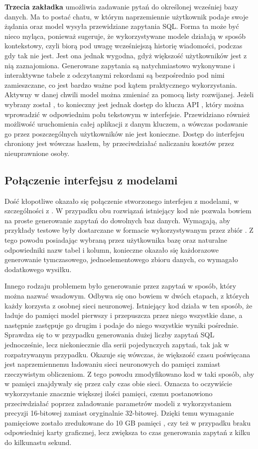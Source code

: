 \textbf{Trzecia zakładka} umożliwia zadawanie pytań do określonej wcześniej bazy danych. Ma to postać chatu, w którym naprzemiennie użytkownik podaje swoje żądania oraz model wysyła przewidziane zapytania SQL. Forma ta może być nieco myląca, ponieważ sugeruje, że wykorzystywane modele działają w sposób kontekstowy, czyli biorą pod uwagę wcześniejszą historię wiadomości, podczas gdy tak nie jest. Jest ona jednak wygodna, gdyż większość użytkowników jest z nią zaznajomiona. Generowane zapytania są natychmiastowo wykonywane i interaktywne tabele z odczytanymi rekordami są bezpośrednio pod nimi zamieszczane, co jest bardzo ważne pod kątem praktycznego wykorzystania. Aktywny w danej chwili model można zmieniać za pomocą listy rozwijanej. Jeżeli wybrany został , to konieczny jest jednak dostęp do klucza API , który można wprowadzić w odpowiednim polu tekstowym w interfejsie. Przewidziano również możliwość uruchomienia całej aplikacji z danym kluczem, a wówczas podawanie go przez poszczególnych użytkowników nie jest konieczne. Dostęp do interfejsu chroniony jest wówczas hasłem, by przeciwdziałać naliczaniu kosztów przez nieuprawnione osoby.

\subsection{Połączenie interfejsu z modelami}
Dość kłopotliwe okazało się połączenie stworzonego interfejsu z modelami, w szczególności z . W przypadku obu rozwiązań istniejący kod nie pozwala bowiem na proste generowanie zapytań do dowolnych baz danych. Wymagają, aby przykłady testowe były dostarczane w formacie wykorzystywanym przez zbiór . Z tego powodu posiadając wybraną przez użytkownika bazę oraz naturalne odpowiedniki nazw tabel i kolumn, konieczne okazało się każdorazowe generowanie tymczasowego, jednoelementowego zbioru danych, co wymagało dodatkowego wysiłku.

Innego rodzaju problemem było generowanie przez  zapytań w sposób, który można nazwać wsadowym. Odbywa się ono bowiem w dwóch etapach, z których każdy korzysta z osobnej sieci neuronowej. Istniejący kod działa w ten sposób, że ładuje do pamięci model pierwszy i przepuszcza przez niego wszystkie dane, a następnie zastępuje go drugim i podaje do niego wszystkie wyniki pośrednie. Sprawdza się to w przypadku generowania dużej liczby zapytań SQL jednocześnie, lecz niekoniecznie dla serii pojedynczych zapytań, tak jak w rozpatrywanym przypadku. Okazuje się wówczas, że większość czasu poświęcana jest naprzemiennemu ładowaniu sieci neuronowych do pamięci zamiast rzeczywistym obliczeniom. Z tego powodu zmodyfikowano kod w taki sposób, aby w pamięci znajdywały się przez cały czas obie sieci. Oznacza to oczywiście wykorzystanie znacznie większej ilości pamięci, czemu postanowiono przeciwdziałać poprzez załadowanie parametrów modeli z wykorzystaniem precyzji 16-bitowej zamiast oryginalnie 32-bitowej. Dzięki temu wymaganie pamięciowe zostało zredukowane do 10 GB pamięci , czy też  w przypadku braku odpowiedniej karty graficznej, lecz zwiększa to czas generowania zapytań z kilku do kilkunastu sekund.


